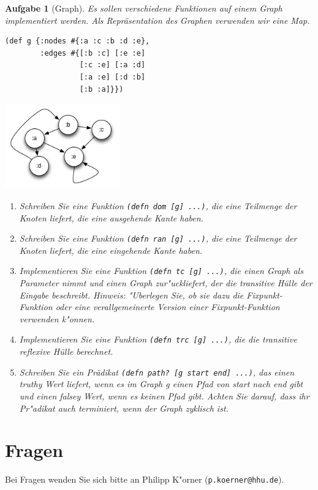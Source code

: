 \documentclass[11pt,a4paper]{article}
\newcounter{numb}
\theoremstyle{break}
\newtheorem{aufgabe}{Aufgabe}[numb]
\begin{document}
\begin{aufgabe}[Graph]
Es sollen verschiedene Funktionen auf einem Graph implementiert werden. Als Repr\"asentation des Graphen verwenden wir eine Map.

\begin{multicols}{2}[]
\begin{verbatim}
(def g {:nodes #{:a :c :b :d :e}, 
        :edges #{[:b :c] [:e :e] 
                 [:c :e] [:a :d] 
                 [:a :e] [:d :b] 
                 [:b :a]}})
\end{verbatim}

\includegraphics[width=5cm]{graph}

\end{multicols}



\begin{enumerate}[label=\alph*)]
  \item Schreiben Sie eine Funktion \texttt{(defn dom [g] ...)}, die eine Teilmenge der Knoten liefert, die eine ausgehende Kante haben.
  \item Schreiben Sie eine Funktion \texttt{(defn ran [g] ...)}, die eine Teilmenge der Knoten liefert, die eine eingehende Kante haben.
  \item Implementieren Sie eine Funktion \texttt{(defn tc [g] ...)}, die einen Graph als Parameter nimmt und einen Graph zur"uckliefert, der die transitive H\"ulle der Eingabe beschreibt. {\it Hinweis: "Uberlegen Sie, ob sie dazu die Fixpunkt-Funktion oder eine verallgemeinerte Version einer Fixpunkt-Funktion verwenden k"onnen.}
  
  \item Implementieren Sie eine Funktion \texttt{(defn trc [g] ...)}, die die transitive reflexive H\"ulle berechnet. 

  \item Schreiben Sie ein Pr\"adikat \texttt{(defn path? [g start end] ...)}, das einen truthy Wert liefert, wenn es im Graph g einen Pfad von start nach end gibt und einen falsey Wert, wenn es keinen Pfad gibt. Achten Sie darauf, dass ihr Pr"adikat auch terminiert, wenn der Graph zyklisch ist.
    \end{enumerate}
\end{aufgabe}


\section*{Fragen}
Bei Fragen wenden Sie sich bitte an Philipp K"orner (\texttt{p.koerner@hhu.de}).
\end{document}
